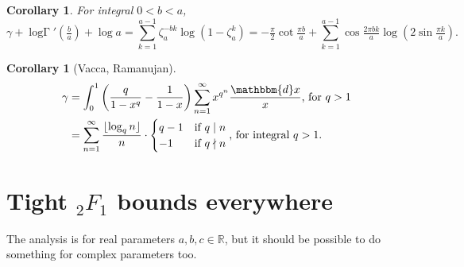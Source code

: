 \documentclass[12pt]{article}
\newcommand{\dd}[0] {\mathbbm{d}}
\newcommand{\logG} {\operatorname {log \Gamma}}
\numberwithin{equation}{section}
\newtheorem{corollary}[theorem]{Corollary}
\begin{document}
\begin{corollary}
For integral $0<b<a$,
\begin{equation*}
\gamma + \logG'(\tfrac{b}{a}) + \log a = \sum_{k=1}^{a-1} \zeta_a^{-b k} \log (1 - \zeta_a^k)= - \tfrac{\pi}{2} \cot \tfrac{\pi b}{a} + \sum_{k=1}^{a-1} \cos \tfrac{2 \pi b k}{a} \log (2 \sin \tfrac{\pi k}{a} )\text{.}
\end{equation*}
\end{corollary}

\begin{corollary}[Vacca, Ramanujan]
\begin{align*}
\gamma &= \int_{0}^{1} \left(\frac{q}{1-x^q} - \frac{1}{1-x}\right) \sum_{n=1}^{\infty}x^{q^n} \frac{\dd x}{x}\text{, for } q > 1\\
&= \sum_{n=1}^{\infty} \frac{\lfloor \log_q n\rfloor}{n} \cdot \begin{cases}
q-1 & \text{if }q \mid n\\
-1 & \text{if }q \nmid n
\end{cases}
\text{, for integral } q>1 \text{.}
\end{align*}
\end{corollary}



\section{Tight ${}_2 F_1$ bounds everywhere}
The analysis is for real parameters $a,b,c \in \mathbb{R}$, but it should be possible to do something for complex parameters too.
\end{document}
